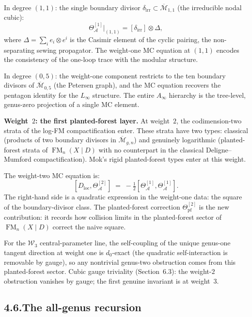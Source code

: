 \documentclass[11pt]{report}
\theoremstyle{definition}
\theoremstyle{remark}
\providecommand{\cA}{\mathcal{A}}
\providecommand{\cM}{\mathcal{M}}
\numberwithin{equation}{section}
\begin{document}
In degree $(1,1)$: the single boundary divisor
$\delta_{\mathrm{irr}}\subset\overline{\cM}_{1,1}$ (the irreducible
nodal cubic):
\[
\Theta^{[1]}_\cA\big|_{(1,1)}
=[\delta_{\mathrm{irr}}]\otimes\Delta,
\]
where $\Delta=\sum_i e_i\otimes e^i$ is the Casimir element of the
cyclic pairing, the non-separating sewing propagator. The weight-one
MC equation at $(1,1)$ encodes the consistency of the one-loop trace
with the modular structure.

In degree $(0,5)$: the weight-one component restricts to the ten
boundary divisors of $\overline{\cM}_{0,5}$ (the Petersen graph), and
the MC equation recovers the pentagon identity for the $L_\infty$
structure. The entire $A_\infty$ hierarchy is the tree-level,
genus-zero projection of a single MC element.

\medskip

\noindent\textbf{Weight~$2$: the first planted-forest layer.}\enspace
At weight~$2$, the codimension-two strata of the log-FM
compactification enter. These strata have two types: classical
(products of two boundary divisors in $\overline{\cM}_{g,n}$) and
genuinely logarithmic (planted-forest strata of
$\operatorname{FM}_n(X\mathbin{|}D)$ with no counterpart in the
classical Deligne--Mumford compactification). Mok's rigid
planted-forest types enter at this weight.

The weight-two MC equation is:
\[
[D_{\mathrm{loc}},\Theta^{[2]}_\cA]
\;=\;
-\tfrac12[\Theta^{[1]}_\cA,\Theta^{[1]}_\cA].
\]
The right-hand side is a quadratic expression in the weight-one data:
the square of the boundary-divisor class. The planted-forest
correction $\Theta^{[2]}_{\mathrm{pf}}$ is the new
contribution: it records how collision limits in the planted-forest
sector of $\operatorname{FM}_n(X\mathbin{|}D)$ correct the naive
square.

For the $\mathcal W_3$ central-parameter line, the self-coupling of
the unique genus-one tangent direction at weight one is $d_0$-exact
(the quadratic self-interaction is removable by gauge), so any
nontrivial genus-two obstruction comes from this planted-forest sector.
Cubic gauge triviality (Section~6.3): the weight-$2$ obstruction
vanishes by gauge; the first genuine invariant is at weight~$3$.

\subsection*{4.6.\enspace The all-genus recursion}
\end{document}
